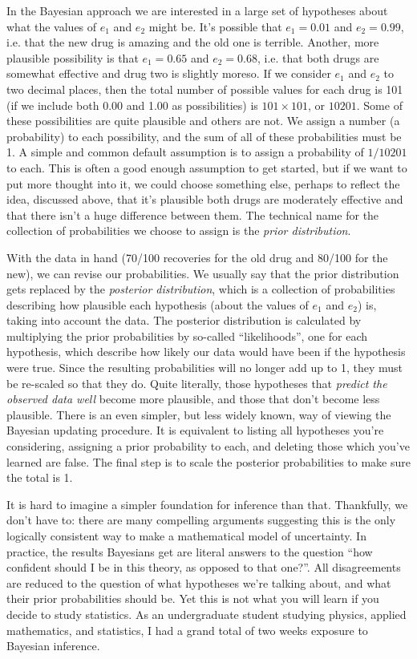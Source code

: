 \documentclass[a4paper, 12pt]{article}
\begin{document}
In the Bayesian approach we are interested in a large set of hypotheses about
what the values of $e_1$ and $e_2$ might be. It's possible that $e_1=0.01$ and
$e_2 = 0.99$, i.e. that the new drug is amazing and the old one is terrible.
Another, more plausible possibility is that $e_1 = 0.65$ and $e_2=0.68$, i.e.
that both drugs are somewhat effective and drug two is slightly moreso. If we
consider $e_1$ and $e_2$ to two decimal places, then the total number of
possible values for each drug is 101 (if we include both 0.00 and 1.00 as
possibilities) is $101 \times 101$, or $10201$.
Some of these possibilities are
quite plausible and others are not. We assign a number (a probability) to each
possibility, and the sum of all of these probabilities must be 1. A simple and
common default assumption is to assign a probability of $1/10201$ to each.
This is often a good enough assumption to get started, but if we want to put
more thought into it, we could choose something else, perhaps to reflect the
idea, discussed above, that it's plausible both drugs are moderately effective
and that there isn't a huge difference between them.
The technical name for the collection of
probabilities we choose to assign is the {\em prior distribution}.

With the data in hand (70/100 recoveries for the old drug and 80/100 for the
new), we can revise our probabilities. We usually say that the
prior distribution gets replaced by the {\em posterior distribution}, which
is a collection of probabilities describing how plausible each hypothesis
(about the values of $e_1$ and $e_2$) is, taking into account the data.
The posterior distribution is calculated by multiplying the prior probabilities
by so-called ``likelihoods'', one for each hypothesis,
which describe how likely our data would have been if the hypothesis were true.
Since the resulting probabilities will no longer add up to 1, they
must be re-scaled so that they do.
Quite literally, those hypotheses that {\it predict the observed data well}
become more plausible, and those that don't become less plausible.
There is an even simpler, but less widely known,
way of viewing the Bayesian updating procedure. It is equivalent to listing
all hypotheses you're considering, assigning a prior probability to each, and
deleting those which you've learned are false. The final step is to scale the
posterior probabilities to make sure the total is 1.

It is hard to imagine a simpler foundation for inference than that. Thankfully,
we don't have to: there are many compelling arguments suggesting this is
the only logically consistent way to make a mathematical model of uncertainty.
In practice, the results Bayesians get are literal answers to the question
``how confident should I be in this theory, as opposed to that one?''. All
disagreements are reduced to the question of what hypotheses we're talking
about, and what their prior probabilities should be.
Yet this is not what you will learn if you decide to study statistics. As an
undergraduate student studying physics, applied mathematics, and statistics,
I had a grand total of two weeks exposure to Bayesian inference.
\end{document}
